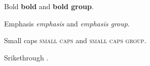 \documentclass{Metanorma}
\begin{document}
  Bold \textbf{bold} and {\bfseries bold group}.

  Emphasis \textit{emphasis} and {\itshape emphasis group}.

  Small caps \textsc{small caps} and {\scshape small caps group}.

  Srikethrough .


















\end{document}
